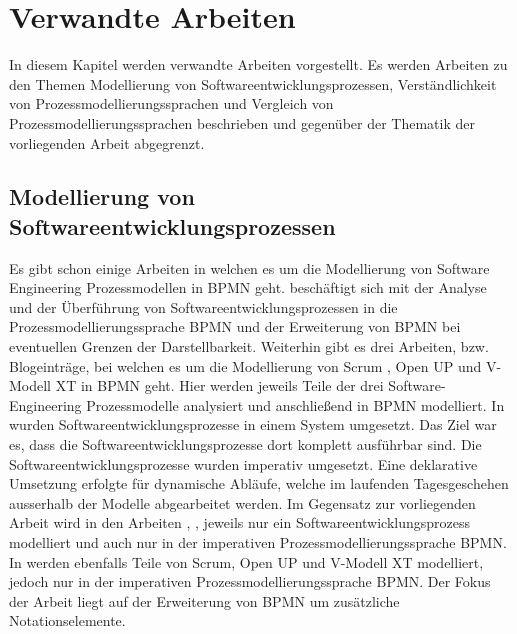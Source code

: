 \chapter{Verwandte Arbeiten}\label{sec:chapter9}

In diesem Kapitel werden verwandte Arbeiten vorgestellt. Es werden Arbeiten zu den Themen Modellierung von Softwareentwicklungsprozessen, Verständlichkeit von Prozessmodellierungssprachen und Vergleich von Prozessmodellierungssprachen beschrieben und gegenüber der Thematik der vorliegenden Arbeit abgegrenzt.

\section{Modellierung von Softwareentwicklungsprozessen}

Es gibt schon einige Arbeiten in welchen es um die Modellierung von Software Engineering Prozessmodellen in BPMN geht.
\cite{Menhorn2014} beschäftigt sich mit der Analyse und der Überführung von Softwareentwicklungsprozessen in die Prozessmodellierungssprache BPMN und der Erweiterung von BPMN bei eventuellen Grenzen der Darstellbarkeit.\newline
Weiterhin gibt es drei Arbeiten, bzw. Blogeinträge, bei welchen es um die Modellierung von Scrum \cite{software}, Open UP \cite{brunner2007fallstudie} und \cite{Bregenzer2014} V-Modell XT in BPMN geht. Hier werden jeweils Teile der drei Software-Engineering Prozessmodelle analysiert und anschließend in BPMN modelliert.\newline
In \cite{sabrina734, sabrina758, sabrina795} wurden Softwareentwicklungsprozesse in einem System umgesetzt. Das Ziel war es, dass die Softwareentwicklungsprozesse dort komplett ausführbar sind. Die Softwareentwicklungsprozesse wurden imperativ umgesetzt. Eine deklarative Umsetzung erfolgte für dynamische Abläufe, welche im laufenden Tagesgeschehen ausserhalb der Modelle abgearbeitet werden.\newline
 Im Gegensatz zur vorliegenden Arbeit wird in den Arbeiten \cite{software}, \cite{brunner2007fallstudie}, \cite{Bregenzer2014} jeweils nur ein Softwareentwicklungsprozess modelliert und auch nur in der imperativen Prozessmodellierungssprache BPMN. In \cite{Menhorn2014} werden ebenfalls Teile von Scrum, Open UP und V-Modell XT modelliert, jedoch nur in der imperativen Prozessmodellierungssprache BPMN. Der Fokus der Arbeit \cite{Menhorn2014} liegt auf der Erweiterung von BPMN um zusätzliche Notationselemente.\newline
